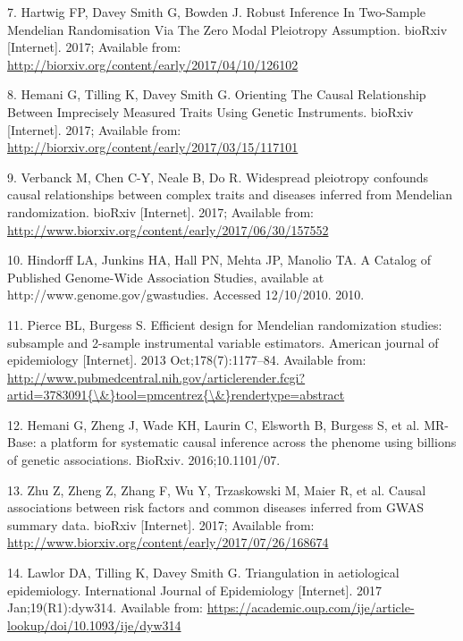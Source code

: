 \documentclass[]{article}
\begin{document}
\hypertarget{ref-Hartwig2017}{}
7. Hartwig FP, Davey Smith G, Bowden J. Robust Inference In Two-Sample
Mendelian Randomisation Via The Zero Modal Pleiotropy Assumption.
bioRxiv {[}Internet{]}. 2017; Available from:
\url{http://biorxiv.org/content/early/2017/04/10/126102}

\hypertarget{ref-Hemani2017}{}
8. Hemani G, Tilling K, Davey Smith G. Orienting The Causal Relationship
Between Imprecisely Measured Traits Using Genetic Instruments. bioRxiv
{[}Internet{]}. 2017; Available from:
\url{http://biorxiv.org/content/early/2017/03/15/117101}

\hypertarget{ref-Verbanck2017}{}
9. Verbanck M, Chen C-Y, Neale B, Do R. Widespread pleiotropy confounds
causal relationships between complex traits and diseases inferred from
Mendelian randomization. bioRxiv {[}Internet{]}. 2017; Available from:
\url{http://www.biorxiv.org/content/early/2017/06/30/157552}

\hypertarget{ref-Hindorff2010}{}
10. Hindorff LA, Junkins HA, Hall PN, Mehta JP, Manolio TA. A Catalog of
Published Genome-Wide Association Studies, available at
http://www.genome.gov/gwastudies. Accessed 12/10/2010. 2010.

\hypertarget{ref-Pierce2013}{}
11. Pierce BL, Burgess S. Efficient design for Mendelian randomization
studies: subsample and 2-sample instrumental variable estimators.
American journal of epidemiology {[}Internet{]}. 2013
Oct;178(7):1177--84. Available from:
\href{http://www.pubmedcentral.nih.gov/articlerender.fcgi?artid=3783091\%7B/\&\%7Dtool=pmcentrez\%7B/\&\%7Drendertype=abstract}{http://www.pubmedcentral.nih.gov/articlerender.fcgi?artid=3783091\{\textbackslash{}\&\}tool=pmcentrez\{\textbackslash{}\&\}rendertype=abstract}

\hypertarget{ref-Hemani2016}{}
12. Hemani G, Zheng J, Wade KH, Laurin C, Elsworth B, Burgess S, et al.
MR-Base: a platform for systematic causal inference across the phenome
using billions of genetic associations. BioRxiv. 2016;10.1101/07.

\hypertarget{ref-Zhu2017}{}
13. Zhu Z, Zheng Z, Zhang F, Wu Y, Trzaskowski M, Maier R, et al. Causal
associations between risk factors and common diseases inferred from GWAS
summary data. bioRxiv {[}Internet{]}. 2017; Available from:
\url{http://www.biorxiv.org/content/early/2017/07/26/168674}

\hypertarget{ref-Lawlor2017}{}
14. Lawlor DA, Tilling K, Davey Smith G. Triangulation in aetiological
epidemiology. International Journal of Epidemiology {[}Internet{]}. 2017
Jan;19(R1):dyw314. Available from:
\url{https://academic.oup.com/ije/article-lookup/doi/10.1093/ije/dyw314}
\end{document}
